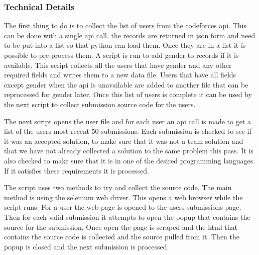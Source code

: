 \documentclass{article}
\begin{document}
\subsubsection{Technical Details}
The first thing to do is to collect the list of users from the codeforces api. This can be done with a single api call. the records are returned in json form and need to be put into a list so that python can load them. Once they are in a list it is possible to pre-process them. A script is run to add gender to records if it is available. This script collects all the users that have gender and any other required fields and writes them to a new data file. Users that have all fields except gender when the api is unavailable are added to another file that can be reprocessed for gender later. Once this list of users is complete it can be used by the next script to collect submission source code for the users.

The next script opens the user file and for each user an api call is made to get a list of the users most recent 50 submissions. Each submission is checked to see if it was an accepted solution, to make sure that it was not a team solution and that we have not already collected a solution to the same problem this pass. It is also checked to make sure that it is in one of the desired programming languages. If it satisfies these requirements it is processed.

The script uses two methods to try and collect the source code. The main method is using the selenium web driver. This opens a web browser while the script runs. For a user the web page is opened to the users submissions page. Then for each valid submission it attempts to open the popup that contains the source for the submission. Once open the page is scraped and the html that contains the source code is collected and the source pulled from it. Then the popup is closed and the next submission is processed.
\end{document}
